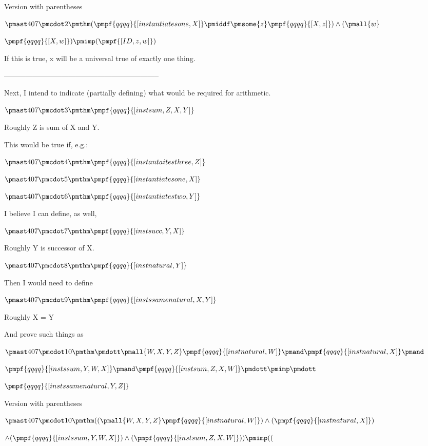 \documentclass[12pt]{article}
\begin{document}
 

Version with parentheses

$\pmast 407 \pmcdot 2 \pmthm  (  \pmpf{qqqq}{[instantiatesone, X]} \pmiddf \pmsome{z} \pmpf{qqqq}{[X, z]} ) \land ( \pmall{w} $

$\pmpf{qqqq}{[X, w]}  ) \pmimp (  \pmpf{[ID, z, w]} )$


If this is true, x will be a universal true of exactly one thing.

-----------------------------------------------------------------

Next, I intend to indicate (partially defining) what would be required for arithmetic.

$\pmast 407 \pmcdot 3 \pmthm \pmpf{qqqq}{[instsum,Z,X,Y]}$

Roughly Z is sum of X and Y.

This would be true if, e.g.:

$\pmast 407 \pmcdot 4 \pmthm \pmpf{qqqq}{[instantaitesthree,Z]}$

$\pmast 407 \pmcdot 5 \pmthm \pmpf{qqqq}{[instantiatesone,X]}$

$\pmast 407 \pmcdot 6 \pmthm \pmpf{qqqq}{[instantiatestwo,Y]}$

I believe I can define, as well,

$\pmast 407 \pmcdot 7 \pmthm \pmpf{qqqq}{[instsucc,Y,X]}$

Roughly Y is successor of X.

$\pmast 407 \pmcdot 8 \pmthm \pmpf{qqqq}{[instnatural,Y]}$

Then I would need to define

$\pmast 407 \pmcdot 9 \pmthm \pmpf{qqqq}{[instssamenatural,X, Y]}$

Roughly X = Y

And prove such things as

$\pmast 407 \pmcdot 10 \pmthm \pmdott \pmall{W,X,Y,Z} \pmpf{qqqq}{[instnatural,W]} \pmand \pmpf{qqqq}{[instnatural,X]} \pmand $

$\pmpf{qqqq}{[instssum,Y,W,X]} \pmand \pmpf{qqqq}{[instsum,Z,X,W]} \pmdott \pmimp \pmdott $

$\pmpf{qqqq}{[instssamenatural, Y, Z]}$
 
 

Version with parentheses

$\pmast 407 \pmcdot 10 \pmthm  ((  \pmall{W,X,Y,Z} \pmpf{qqqq}{[instnatural,W]} ) \land ( \pmpf{qqqq}{[instnatural,X]} ) $

$\land ( \pmpf{qqqq}{[instssum,Y,W,X]} ) \land ( \pmpf{qqqq}{[instsum,Z,X,W]}  )) \pmimp ((  $
\end{document}
